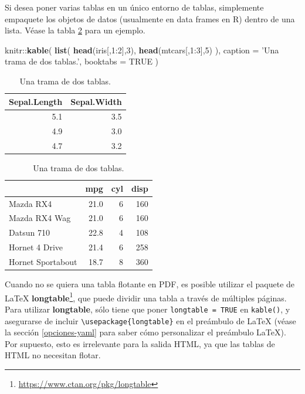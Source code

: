 \documentclass[12pt,]{krantz}
\makeatletter
\newenvironment{Shaded}{\begin{snugshade}}{\end{snugshade}}
\newcommand{\KeywordTok}[1]{\textcolor[rgb]{0.13,0.29,0.53}{\textbf{{#1}}}}
\newcommand{\DataTypeTok}[1]{\textcolor[rgb]{0.13,0.29,0.53}{{#1}}}
\newcommand{\DecValTok}[1]{\textcolor[rgb]{0.00,0.00,0.81}{{#1}}}
\newcommand{\StringTok}[1]{\textcolor[rgb]{0.31,0.60,0.02}{{#1}}}
\newcommand{\OtherTok}[1]{\textcolor[rgb]{0.56,0.35,0.01}{{#1}}}
\newcommand{\NormalTok}[1]{{#1}}
\renewcommand{\href}[2]{#2\footnote{\url{#1}}}
\newenvironment{kframe}{%
\medskip{}
\setlength{\fboxsep}{.8em}
 \def\at@end@of@kframe{}%
 \ifinner\ifhmode%
  \def\at@end@of@kframe{\end{minipage}}%
  \begin{minipage}{\columnwidth}%
 \fi\fi%
 \def\FrameCommand##1{\hskip\@totalleftmargin \hskip-\fboxsep
 \colorbox{shadecolor}{##1}\hskip-\fboxsep
     \hskip-\linewidth \hskip-\@totalleftmargin \hskip\columnwidth}%
 \MakeFramed {\advance\hsize-\width
   \@totalleftmargin\z@ \linewidth\hsize
   \@setminipage}}%
 {\par\unskip\endMakeFramed%
 \at@end@of@kframe}
\renewenvironment{Shaded}{\begin{kframe}}{\end{kframe}}
\theoremstyle{definition}
\theoremstyle{definition}
\theoremstyle{remark}
\makeatother
\begin{document}
Si desea poner varias tablas en un único entorno de tablas, simplemente
empaquete los objetos de datos (usualmente en data frames en R) dentro
de una lista. Véase la tabla \ref{tab:table-multi} para un ejemplo.

\begin{Shaded}
\begin{Highlighting}[]
\NormalTok{knitr::}\KeywordTok{kable}\NormalTok{(}
  \KeywordTok{list}\NormalTok{(}
    \KeywordTok{head}\NormalTok{(iris[,}\DecValTok{1}\NormalTok{:}\DecValTok{2}\NormalTok{],}\DecValTok{3}\NormalTok{),}
    \KeywordTok{head}\NormalTok{(mtcars[,}\DecValTok{1}\NormalTok{:}\DecValTok{3}\NormalTok{],}\DecValTok{5}\NormalTok{)}
  \NormalTok{),}
  \DataTypeTok{caption =} \StringTok{'Una trama de dos tablas.'}\NormalTok{, }\DataTypeTok{booktabs =} \OtherTok{TRUE}
\NormalTok{)}
\end{Highlighting}
\end{Shaded}

\begin{table}
\caption{\label{tab:table-multi}Una trama de dos tablas.}

\centering
\begin{tabular}[t]{rr}
\toprule
Sepal.Length & Sepal.Width\\
\midrule
5.1 & 3.5\\
4.9 & 3.0\\
4.7 & 3.2\\
\bottomrule
\end{tabular}
\centering
\begin{tabular}[t]{lrrr}
\toprule
  & mpg & cyl & disp\\
\midrule
Mazda RX4 & 21.0 & 6 & 160\\
Mazda RX4 Wag & 21.0 & 6 & 160\\
Datsun 710 & 22.8 & 4 & 108\\
Hornet 4 Drive & 21.4 & 6 & 258\\
Hornet Sportabout & 18.7 & 8 & 360\\
\bottomrule
\end{tabular}
\end{table}

Cuando no se quiera una tabla flotante en PDF, es posible utilizar el
paquete de LaTeX
\href{https://www.ctan.org/pkg/longtable}{\textbf{longtable}}, que puede
dividir una tabla a través de múltiples páginas. Para utilizar
\textbf{longtable}, sólo tiene que poner \texttt{longtable\ =\ TRUE} en
\texttt{kable()}, y asegurarse de incluir
\texttt{\textbackslash{}usepackage\{longtable\}} en el preámbulo de
LaTeX (véase la sección \ref{opciones-yaml} para saber cómo personalizar
el preámbulo LaTeX). Por supuesto, esto es irrelevante para la salida
HTML, ya que las tablas de HTML no necesitan flotar.
\end{document}
